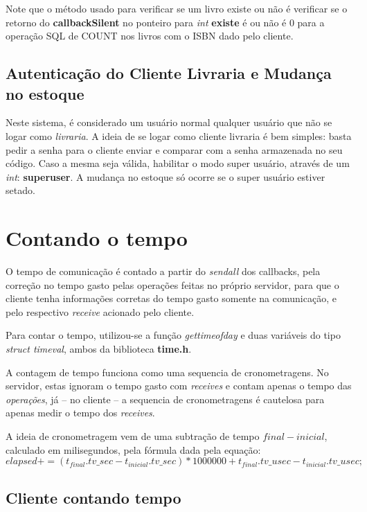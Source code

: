 \documentclass[10pt,a4paper]{report}
\begin{document}
Note que o método usado para verificar se um livro existe ou não é verificar se o retorno do \textbf{callbackSilent} no ponteiro para \textit{int} \textbf{existe} é ou não é 0 para a operação SQL de COUNT nos livros com o ISBN dado pelo cliente.

\subsection{Autenticação do Cliente Livraria e Mudança no estoque}


Neste sistema, é considerado um usuário normal qualquer usuário que não se logar como \textit{livraria}.
A ideia de se logar como cliente livraria é bem simples: basta pedir a senha para o cliente enviar e comparar com a senha armazenada no seu código. Caso a mesma seja válida, habilitar o modo super usuário, através de um \textit{int}: \textbf{superuser}.
A mudança no estoque só ocorre se o super usuário estiver setado.

\section{Contando o tempo}


O tempo de comunicação é contado a partir do \textit{sendall} dos callbacks, pela correção no tempo gasto pelas operações feitas no próprio servidor, para que o cliente tenha informações corretas do tempo gasto somente na comunicação, e pelo respectivo \textit{receive} acionado pelo cliente.

Para contar o tempo, utilizou-se a função \textit{gettimeofday} e duas variáveis do tipo \textit{struct timeval}, ambos da biblioteca \textbf{time.h}.

A contagem de tempo funciona como uma sequencia de cronometragens. No servidor, estas ignoram o tempo gasto com \emph{receives} e contam apenas o tempo das \emph{operações}, já -- no cliente -- a sequencia de cronometragens é cautelosa para apenas medir o tempo dos \emph{receives}.

A ideia de cronometragem vem de uma subtração de tempo $final - inicial$, calculado em milisegundos, pela fórmula dada pela equação:
\begin{equation}
elapsed += (t_{final}.tv\_sec-t_{inicial}.tv\_sec)*1000000 + t_{final}.tv\_usec-t_{inicial}.tv\_usec;
\end{equation}
\subsection{Cliente contando tempo}
\end{document}
